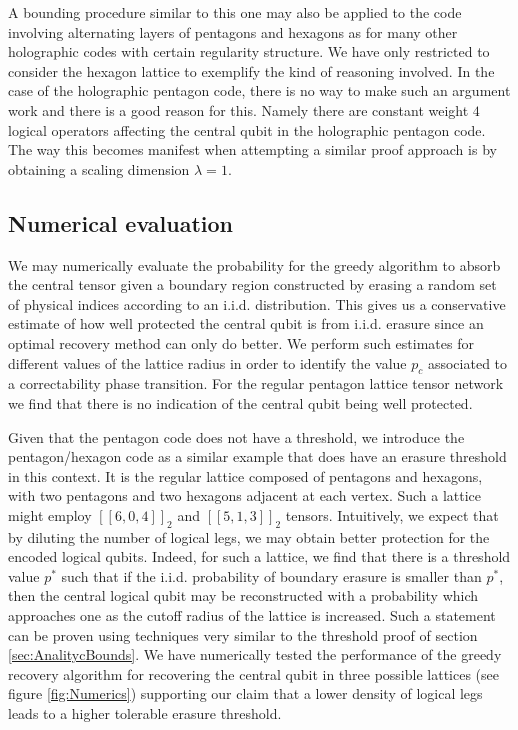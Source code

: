 \documentclass[12pt]{article}
\theoremstyle{plain}
\theoremstyle{plain}
\theoremstyle{plain}
\theoremstyle{plain}
\theoremstyle{result}
\theoremstyle{remark}
\theoremstyle{conjecture}
\theoremstyle{observation}
\theoremstyle{definition}
\theoremstyle{corollary}
\theoremstyle{definition}
\theoremstyle{definition}
\theoremstyle{assumption}
\theoremstyle{definition}
\theoremstyle{problem}
\theoremstyle{fact}
\begin{document}
A bounding procedure similar to this one may also be applied to the code involving alternating layers of pentagons and hexagons as for many other holographic codes with certain regularity structure.
We have only restricted to consider the hexagon lattice to exemplify the kind of reasoning involved.
In the case of the holographic pentagon code, there is no way to make such  an argument work and there is a good reason for this.
Namely there are constant weight $4$ logical operators affecting the central qubit in the holographic pentagon code.
The way this becomes manifest when attempting a similar proof approach is by obtaining a scaling dimension $\lambda=1$.

\subsection{Numerical evaluation}

We may numerically evaluate the probability for the greedy algorithm to absorb the central tensor given a boundary region constructed by erasing a random set of physical indices according to an i.i.d. distribution.
This gives us a conservative estimate of how well protected the central qubit is from i.i.d. erasure since an optimal recovery method can only do better.
We perform such estimates for different values of the lattice radius in order to identify the value $p_c$ associated to a correctability phase transition.
For the regular pentagon lattice tensor network we find that there is no indication of the central qubit being well protected.

Given that the pentagon code does not have a threshold, we introduce the pentagon/hexagon code as a similar example that does have an erasure threshold in this context.
It is the regular lattice composed of pentagons and hexagons, with two pentagons and two hexagons adjacent at each vertex.
Such a lattice might employ $[[6,0,4]]_2$ and $[[5,1,3]]_2$ tensors.
Intuitively, we expect that by diluting the number of logical legs, we may obtain better protection for the encoded logical qubits.
Indeed, for such a lattice, we find that there is a threshold value $p^*$ such that if the i.i.d. probability of boundary erasure is smaller than $p^*$, then the central logical qubit may be reconstructed with a probability which approaches one as the cutoff radius of the lattice is increased.
Such a statement can be proven using techniques very similar to the threshold proof of section \ref{sec:AnalitycBounds}.
We have numerically tested the performance of the greedy recovery algorithm for recovering the central qubit in three possible lattices (see figure \ref{fig:Numerics}) supporting our claim that a lower density of logical legs leads to a higher tolerable erasure threshold.
\end{document}
